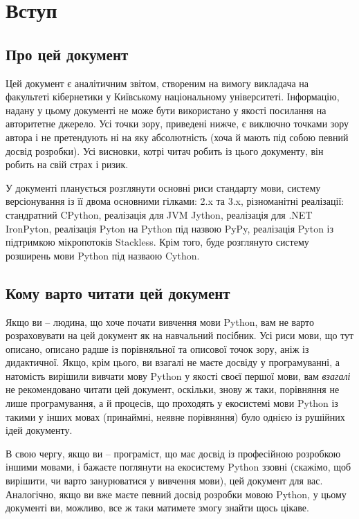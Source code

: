 \documentclass[a4paper, 12pt, onsedie]{article}
\begin{document}
\section{Вступ}

\subsection{Про цей документ}

Цей документ є аналітичним звітом, створеним на вимогу викладача на факультеті кібернетики у Київському
національному університеті. Інформацію, надану у цьому документі не може бути використано у якості посилання на
авторитетне джерело. Усі точки зору, приведені нижче, є виключно точками зору автора і не претендують ні на яку
абсолютність (хоча й мають під собою певний досвід розробки). Усі висновки, котрі читач робить із цього
документу, він робить на свій страх і ризик.

У документі планується розглянути основні риси стандарту мови, систему версіонування із її двома основними
гілками: 2.x та 3.x, різноманітні реалізації: стандратний CPython, реалізація для JVM Jython, реалізація для 
.NET IronPyton, реалізація Pyton на Python під назвою PyPy, реалізація Pyton із підтримкою мікропотоків Stackless. 
Крім того, буде розглянуто систему розширень мови Python під назваою Cython.

\subsection{Кому варто читати цей документ}
Якщо ви -- людина, що хоче почати вивчення мови Python, вам не варто розраховувати на цей документ як
на навчальний посібник. Усі риси мови, що тут описано, описано радше із порівняльної та описової точок
зору, аніж із дидактичної. Якщо, крім цього, ви взагалі не маєте досвіду у програмуванні, а натомість
вирішили вивчати мову Python у якості своєї першої мови, вам \emph{взагалі} не рекомендовано читати цей
документ, оскільки, знову ж таки, порівняння не лише програмування, а й процесів, що проходять у екосистемі
мови Python із такими у інших мовах (принаймні, неявне порівняння) було однією із рушійних ідей документу.

В свою чергу, якщо ви -- програміст, що має досвід із професійною розробкою іншими мовами, і бажаєте
поглянути на екосистему Python ззовні (скажімо, щоб вирішити, чи варто занурюватися у вивчення мови),
цей документ для вас. Аналогічно, якщо ви вже маєте певний досвід розробки мовою Python, у цьому документі
ви, можливо, все ж таки матимете змогу знайти щось цікаве.
\end{document}
